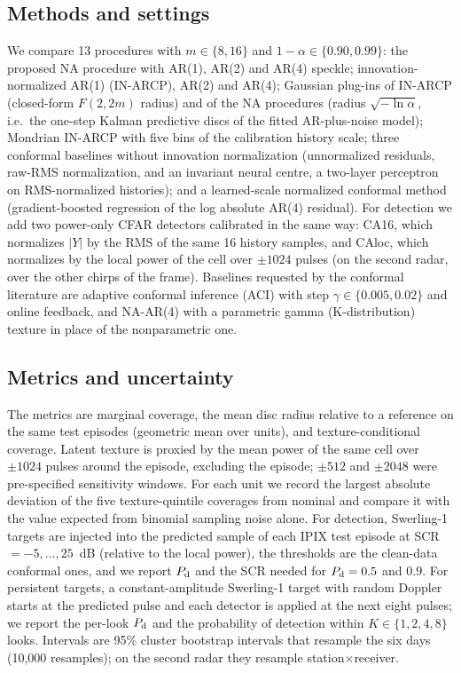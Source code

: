 \documentclass[journal]{IEEEtran}
\begin{document}
\subsection{Methods and settings}
We compare 13 procedures with $m\in\{8,16\}$ and $1-\alpha\in\{0.90,0.99\}$: the proposed NA procedure with AR(1), AR(2) and AR(4) speckle; innovation-normalized AR(1) (IN-ARCP), AR(2) and AR(4); Gaussian plug-ins of IN-ARCP (closed-form $F(2,2m)$ radius) and of the NA procedures (radius $\sqrt{-\ln\alpha}$, i.e.\ the one-step Kalman predictive discs of the fitted AR-plus-noise model); Mondrian IN-ARCP with five bins of the calibration history scale; three conformal baselines without innovation normalization (unnormalized residuals, raw-RMS normalization, and an invariant neural centre, a two-layer perceptron on RMS-normalized histories); and a learned-scale normalized conformal method (gradient-boosted regression of the log absolute AR(4) residual). For detection we add two power-only CFAR detectors calibrated in the same way: CA16, which normalizes $|Y|$ by the RMS of the same 16 history samples, and CAloc, which normalizes by the local power of the cell over $\pm1024$ pulses (on the second radar, over the other chirps of the frame). Baselines requested by the conformal literature are adaptive conformal inference (ACI) \cite{gibbs2021aci} with step $\gamma\in\{0.005,0.02\}$ and online feedback, and NA-AR(4) with a parametric gamma (K-distribution) texture in place of the nonparametric one.

\subsection{Metrics and uncertainty}
The metrics are marginal coverage, the mean disc radius relative to a reference on the same test episodes (geometric mean over units), and texture-conditional coverage. Latent texture is proxied by the mean power of the same cell over $\pm1024$ pulses around the episode, excluding the episode; $\pm512$ and $\pm2048$ were pre-specified sensitivity windows. For each unit we record the largest absolute deviation of the five texture-quintile coverages from nominal and compare it with the value expected from binomial sampling noise alone. For detection, Swerling-1 targets are injected into the predicted sample of each IPIX test episode at SCR $=-5,\dots,25$~dB (relative to the local power), the thresholds are the clean-data conformal ones, and we report $P_{\rm d}$ and the SCR needed for $P_{\rm d}=0.5$ and $0.9$. For persistent targets, a constant-amplitude Swerling-1 target with random Doppler starts at the predicted pulse and each detector is applied at the next eight pulses; we report the per-look $P_{\rm d}$ and the probability of detection within $K\in\{1,2,4,8\}$ looks. Intervals are 95\% cluster bootstrap intervals that resample the six days (10,000 resamples); on the second radar they resample station$\times$receiver.
\end{document}
